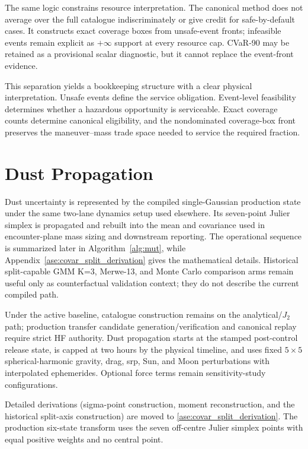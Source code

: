     The same logic constrains resource interpretation. The canonical method does not average over the full catalogue indiscriminately or give credit for safe-by-default cases. It constructs exact coverage boxes from unsafe-event fronts; infeasible events remain explicit as \(+\infty\) support at every resource cap. CVaR-90 may be retained as a provisional scalar diagnostic, but it cannot replace the event-front evidence.

    This separation yields a bookkeeping structure with a clear physical interpretation. Unsafe events define the service obligation. Event-level feasibility determines whether a hazardous opportunity is serviceable. Exact coverage counts determine canonical eligibility, and the nondominated coverage-box front preserves the maneuver--mass trade space needed to service the required fraction.

    \clearpage
\section{Dust Propagation} \label{se:dustprop}
    Dust uncertainty is represented by the compiled single-Gaussian production state under the same two-lane dynamics setup used elsewhere. Its seven-point Julier simplex is propagated and rebuilt into the mean and covariance used in encounter-plane mass sizing and downstream reporting. The operational sequence is summarized later in Algorithm~\ref{alg:mut}, while Appendix~\ref{ase:covar_split_derivation} gives the mathematical details. Historical split-capable GMM K=3, Merwe-13, and Monte Carlo comparison arms remain useful only as counterfactual validation context; they do not describe the current compiled path.

    Under the active baseline, catalogue construction remains on the analytical/\(J_2\) path; production transfer candidate generation/verification and canonical replay require strict HF authority. Dust propagation starts at the stamped post-control release state, is capped at two hours by the physical timeline, and uses fixed \(5\times5\) spherical-harmonic gravity, drag, \gls{srp}, Sun, and Moon perturbations with interpolated ephemerides. Optional force terms remain sensitivity-study configurations.

    Detailed derivations (sigma-point construction, moment reconstruction, and the historical split-axis construction) are moved to \cref{ase:covar_split_derivation}. The production six-state transform uses the seven off-centre Julier simplex points with equal positive weights and no central point.

